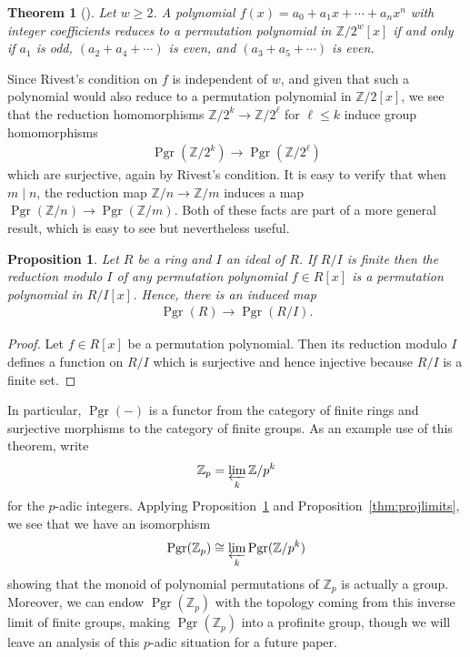 \documentclass[oneside]{amsart}
\theoremstyle{nthm}
\newtheorem{thm2}[subsection]{Theorem}
\newtheorem{prop}[subsection]{Proposition}
\theoremstyle{ndef}
\theoremstyle{nrem}
\newcommand{\Z}{\mathbb{Z}}
\DeclareMathOperator{\Pgr}{Pgr}
\begin{document}
\begin{thm2}[{\cite{Rivest2001}}] Let $w\geq 2$. A polynomial $f(x) = a_0 + a_1x + \cdots + a_nx^n$ with integer coefficients reduces to a permutation polynomial in $\Z/2^w[x]$ if and only if $a_1$ is odd, $(a_2 + a_4 + \cdots )$ is even, and $(a_3 + a_5 + \cdots)$ is even. 
\end{thm2}
Since Rivest's condition on $f$ is independent of $w$, and given that such a polynomial would also reduce to a permutation polynomial in $\Z/2[x]$, we see that the reduction homomorphisms $\Z/2^k\to \Z/2^\ell$ for $\ell\leq k$ induce group homomorphisms
\begin{align*}
    \Pgr(\Z/2^k)\to \Pgr(\Z/2^\ell)
\end{align*}
which are surjective, again by Rivest's condition. It is easy to verify that when $m \mid n$, the reduction map $\Z/n\to \Z/m$ induces a map $\Pgr(\Z/n)\to\Pgr(\Z/m)$. Both of these facts are part of a more general result, which is easy to see but nevertheless useful.
\begin{prop}\label{thm:redFunctor}
    Let $R$ be a ring and $I$ an ideal of $R$. If $R/I$ is finite then the reduction modulo $I$ of any permutation polynomial $f\in R[x]$ is a permutation polynomial in $R/I[x]$. Hence, there is an induced map
    \begin{align*}
        \Pgr(R)\longrightarrow \Pgr(R/I).
    \end{align*}
\end{prop}
\begin{proof}
    Let $f\in R[x]$ be a permutation polynomial. Then its reduction modulo $I$ defines a function on $R/I$ which is surjective and hence injective because $R/I$ is a finite set.
\end{proof}
In particular, $\Pgr(-)$ is a functor from the category of finite rings and surjective morphisms to the category of finite groups. As an example use of this theorem, write 
\begin{align*}
\Z_p = \varprojlim_k \Z/p^k
\end{align*}
for the $p$-adic integers. Applying Proposition~\ref{thm:redFunctor} and Proposition~\ref{thm:projlimits}, we see that we have an isomorphism
\begin{align*}
    \Pgr(\Z_p) \cong \varprojlim_k \Pgr(\Z/p^k)
\end{align*}
showing that the monoid of polynomial permutations of $\Z_p$ is actually a group. Moreover, we can endow $\Pgr(\Z_p)$ with the topology coming from this inverse limit of finite groups, making $\Pgr(\Z_p)$ into a profinite group, though we will leave an analysis of this $p$-adic situation for a future paper. 
\end{document}

